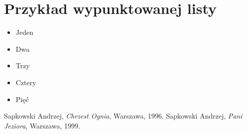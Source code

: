 \documentclass[12pt]{article}
\begin{document}
\section{Przykład wypunktowanej listy}
\begin{itemize}
\item Jeden
\item Dwa
\item Trzy
\item Cztery
\item Pięć
\end{itemize}

\begin{thebibliography}{9}
 Sapkowski Andrzej,
 \emph{Chrzest Ognia},
 Warszawa,
 1996.
 Sapkowski Andrzej,
 \emph{Pani Jeziora},
 Warszawa,
 1999.
\end{thebibliography}
\end{document}

